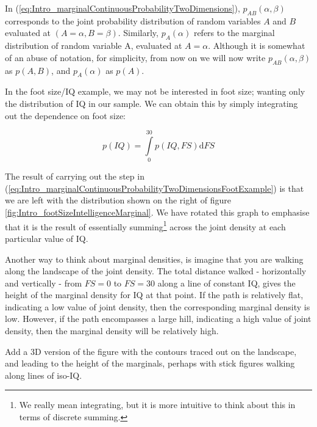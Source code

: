 \documentclass[11pt,fullpage]{book}
\begin{document}
In (\ref{eq:Intro_marginalContinuousProbabilityTwoDimensions}), $p_{AB}(\alpha,\beta)$ corresponds to the joint probability distribution of random variables $A$ and $B$ evaluated at $(A=\alpha,B=\beta)$. Similarly, $p_A(\alpha)$ refers to the marginal distribution of random variable A, evaluated at $A=\alpha$. Although it is somewhat of an abuse of notation, for simplicity, from now on we will now write $p_{AB}(\alpha,\beta)$ as $p(A,B)$, and $p_A(\alpha)$ as $p(A)$.

In the foot size/IQ example, we may not be interested in foot size; wanting only the distribution of IQ in our sample. We can obtain this by simply integrating out the dependence on foot size:

\begin{equation}\label{eq:Intro_marginalContinuousProbabilityTwoDimensionsFootExample}
p(IQ) = \int\limits_{0}^{30} p(IQ,FS) \mathrm{d}FS
\end{equation}

The result of carrying out the step in (\ref{eq:Intro_marginalContinuousProbabilityTwoDimensionsFootExample}) is that we are left with the distribution shown on the right of figure \ref{fig:Intro_footSizeIntelligenceMarginal}. We have rotated this graph to emphasise that it is the result of essentially summing\footnote{We really mean integrating, but it is more intuitive to think about this in terms of discrete summing.} across the joint density at each particular value of IQ. 

Another way to think about marginal densities, is imagine that you are walking along the landscape of the joint density. The total distance walked - horizontally and vertically - from $FS=0$ to $FS=30$ along a line of constant IQ, gives the height of the marginal density for IQ at that point. If the path is relatively flat, indicating a low value of joint density, then the corresponding marginal density is low. However, if the path encompasses a large hill, indicating a high value of joint density, then the marginal density will be relatively high.

Add a 3D version of the figure with the contours traced out on the landscape, and leading to the height of the marginals, perhaps with stick figures walking along lines of iso-IQ.
\end{document}
